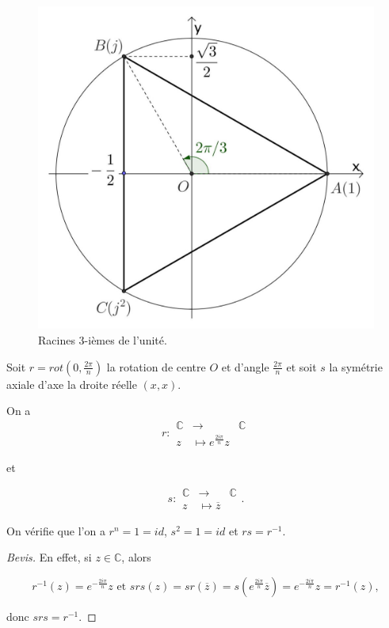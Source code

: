 \documentclass[french]{book}
\theoremstyle{definition}
\theoremstyle{remark}
\begin{document}
\begin{figure}[h!]
  \centering
  \includegraphics[scale=0.3]{figures/racines-3.jpg}
  \caption{Racines 3-ièmes de l'unité.}
  \label{}
\end{figure}

Soit $r = rot(0, \frac{2 \pi}{n})$ la rotation de centre $O$ et d'angle $\frac{2 \pi}{n}$ et soit $s$ la symétrie axiale d'axe la droite réelle $(x,x)$.

On a \[
r:\begin{array}{rcl}
\mathbb{C} & \longrightarrow & \mathbb{C} \\
z & \longmapsto e^{\frac{2 i \pi}{n}} z
\end{array}
\]

et

\[
s:
  \begin{array}{rcl}
  \mathbb{C} & \longrightarrow & \mathbb{C} \\
  z & \longmapsto \overline{z}
  \end{array}.
\]


On vérifie que l'on a $r ^{n} = 1 = id$, $s ^2 = 1 =id$ et $rs = r ^{-1} $.

\begin{proof}[Bevis]
  En effet, si $z \in \mathbb{C}$, alors

  \[
  r ^{-1} (z) = e^{- \frac{2 i \pi}{n}} z \text{ et } s r s(z) = s r (\overline{z} ) = s \left( e^{\frac{2 i \pi}{n}} \overline{z} \right) = e^{- \frac{2 i \pi}{n}} z = r ^{-1} (z),
  \]

  donc $s r s = r ^{-1} $.
\end{proof}
\end{document}
